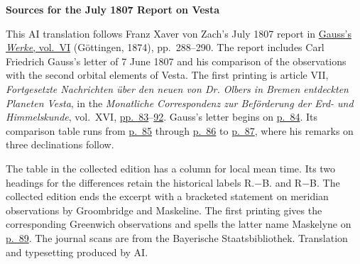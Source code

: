 \clearpage\thispagestyle{empty}
\begin{center}\textbf{Sources for the July 1807 Report on Vesta}\end{center}
\noindent This AI translation follows Franz Xaver von Zach’s July 1807 report in \href{https://gdz.sub.uni-goettingen.de/id/PPN236007467}{Gauss’s \textit{Werke}, vol.~VI} (Göttingen, 1874), pp.~288--290. The report includes Carl Friedrich Gauss’s letter of 7 June 1807 and his comparison of the observations with the second orbital elements of Vesta. The first printing is article VII, \textit{Fortgesetzte Nachrichten über den neuen von Dr. Olbers in Bremen entdeckten Planeten Vesta}, in the \textit{Monatliche Correspondenz zur Beförderung der Erd- und Himmelskunde}, vol.~XVI, \href{https://www.digitale-sammlungen.de/en/view/bsb10538607?page=91}{pp.~83}--\href{https://www.digitale-sammlungen.de/en/view/bsb10538607?page=100}{92}. Gauss’s letter begins on \href{https://www.digitale-sammlungen.de/en/view/bsb10538607?page=92}{p.~84}. Its comparison table runs from \href{https://www.digitale-sammlungen.de/en/view/bsb10538607?page=93}{p.~85} through \href{https://www.digitale-sammlungen.de/en/view/bsb10538607?page=94}{p.~86} to \href{https://www.digitale-sammlungen.de/en/view/bsb10538607?page=95}{p.~87}, where his remarks on three declinations follow.
\par\medskip
The table in the collected edition has a column for local mean time. Its two headings for the differences retain the historical labels R.$-$B. and R$-$B. The collected edition ends the excerpt with a bracketed statement on meridian observations by Groombridge and Maskeline. The first printing gives the corresponding Greenwich observations and spells the latter name Maskelyne on \href{https://www.digitale-sammlungen.de/en/view/bsb10538607?page=97}{p.~89}. The journal scans are from the Bayerische Staatsbibliothek. Translation and typesetting produced by AI.
\clearpage
